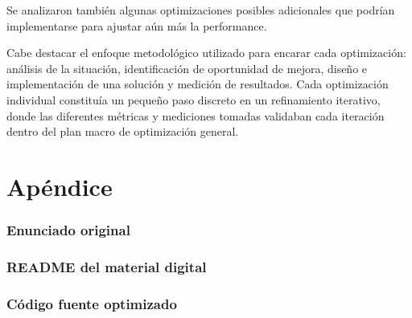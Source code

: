 \documentclass[a4paper,11pt]{article}
\begin{document}
Se analizaron también algunas optimizaciones posibles adicionales que podrían
implementarse para ajustar aún más la performance.

Cabe destacar el enfoque metodológico utilizado para encarar cada optimización:
análisis de la situación, identificación de oportunidad de mejora, diseño e
implementación de una solución y medición de resultados. Cada optimización
individual constituía un pequeño paso discreto en un refinamiento iterativo,
donde las diferentes métricas y mediciones tomadas validaban cada iteración
dentro del plan macro de optimización general.

\clearpage

\part{Apéndice}
\appendix

\section{Enunciado original}\label{sec:enunciado}


\clearpage
\section{README del material digital}\label{sec:readme}


\clearpage
\section{Código fuente optimizado}\label{sec:source}
\clearpage

\end{document}
